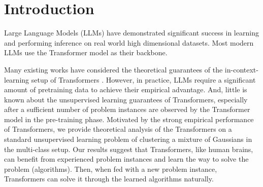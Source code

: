 \section{Introduction}
Large Language Models (LLMs) have demonstrated significant success in learning and performing inference on real world high dimensional datasets. Most modern LLMs use the Transformer model \citep{vaswani2017attention} as their backbone. 

Many existing works have considered the theoretical guarantees of the in-context-learning setup of Transformers \citep{bai2024transformers, akyurek2022learning}. However, in practice, LLMs require a significant amount of pretraining data to achieve their empirical advantage. And, little is known about the unsupervised learning guarantees of Transformers, especially after a sufficient number of problem instances are observed by the Transformer model in the pre-training phase. Motivated by the strong empirical performance of Transformers, we provide theoretical analysis of the Transformers on a standard unsupervised learning problem of clustering a mixture of Gaussians in the multi-class setup. Our results suggest that Transformers, like human brains, can benefit from experienced problem instances and learn the way to solve the problem (algorithms). Then, when fed with a new problem instance, Transformers can solve it through the learned algorithms naturally.

